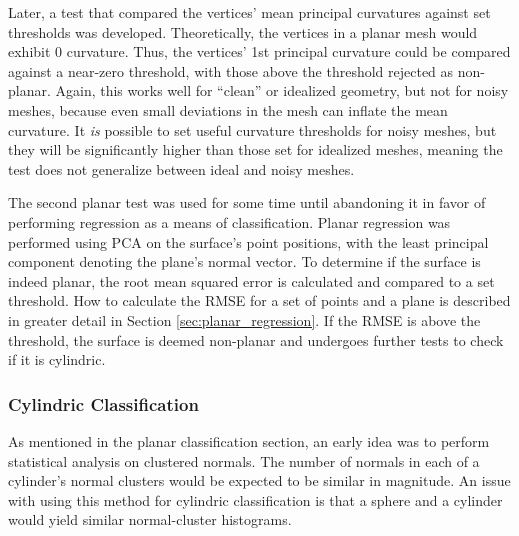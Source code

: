 Later, a test that compared the vertices' mean principal curvatures against set thresholds was developed.
Theoretically, the vertices in a planar mesh would exhibit 0 curvature.
Thus, the vertices' 1st principal curvature could be compared against a near-zero threshold, with those above the threshold rejected as non-planar.
Again, this works well for ``clean'' or idealized geometry, but not for noisy meshes, because even small deviations in the mesh can inflate the mean curvature.
It \textit{is} possible to set useful curvature thresholds for noisy meshes, but they will be significantly higher than those set for idealized meshes, meaning the test does not generalize between ideal and noisy meshes.

The second planar test was used for some time until abandoning it in favor of performing regression as a means of classification.
Planar regression was performed using PCA on the surface's point positions, with the least principal component denoting the plane's normal vector.
To determine if the surface is indeed planar, the root mean squared error is calculated and compared to a set threshold.
How to calculate the RMSE for a set of points and a plane is described in greater detail in Section \ref{sec:planar_regression}.
If the RMSE is above the threshold, the surface is deemed non-planar and undergoes further tests to check if it is cylindric.

\subsubsection{Cylindric Classification}

As mentioned in the planar classification section, an early idea was to perform statistical analysis on clustered normals.
The number of normals in each of a cylinder's normal clusters would be expected to be similar in magnitude.
An issue with using this method for cylindric classification is that a sphere and a cylinder would yield similar normal-cluster histograms.

